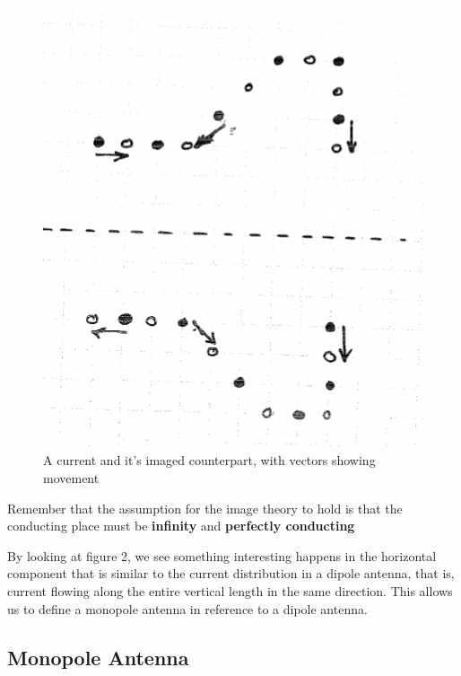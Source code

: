 \documentclass{article}
\begin{document}
\begin{figure}[H]
  \centering
     \includegraphics[scale=0.8]{Course Notes/images/8.2.png}
  \caption{A current and it's imaged counterpart, with vectors showing movement}
\end{figure}

Remember that the assumption for the image theory to hold is that the conducting place must be \textbf{infinity} and \textbf{perfectly conducting}

By looking at figure 2, we see something interesting happens in the horizontal component that is similar to the current distribution in a dipole antenna, that is, current flowing along the entire vertical length in the same direction. This allows us to define a monopole antenna in reference to a dipole antenna.

\subsection{Monopole Antenna}
\end{document}
